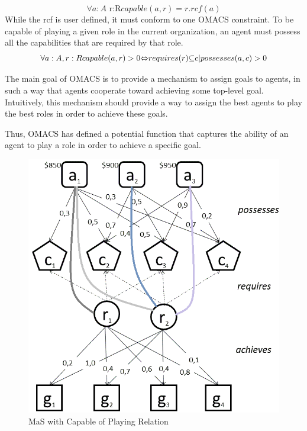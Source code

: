 \begin{equation}
\forall a:A\textrm{ r:R}capable(a,r)=r.rcf(a)\label{eq:Funccapable}
\end{equation}
While the rcf is user defined, it must conform to one OMACS constraint. 
To be capable of playing a given role in the current organization,
 an agent must possess all the capabilities that are required by that role\cite{omacs2}.
\begin{equation}
\text{\ensuremath{\forall}}a:A,r:Rcapable(a,r)>0\text{\ensuremath{\Leftrightarrow}}requires(r)\text{\ensuremath{\subseteq}}{c|possesses(a,c)>0}\label{eq:FuncCapable2}
\end{equation}

The main goal of OMACS is to provide a mechanism to assign goals to agents\cite{omacs2}, 
in such a way that agents cooperate toward achieving some top-level goal.
Intuitively, this mechanism should provide a way to assign the best agents 
to play the best roles in order to achieve these goals. 

Thus, OMACS has defined a potential function that captures the ability of an agent 
to play a role in order to achieve a specific goal\cite{omacs2}.

\begin{figure}[th]
	\centering
		\includegraphics[scale=0.5]{ch1/img/mag}
	\caption{\label{fig:Capable Of playing Relation} MaS with Capable of Playing Relation \cite{omacs0}}
\end{figure}
\pagebreak
